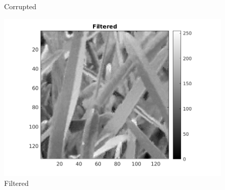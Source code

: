 \documentclass[12pt, a4paper]{article}
\begin{document}
\begin{figure}[h]
\begin{minipage}[c][1\width]{0.3\textwidth}
    	\caption{Corrupted}
	    \label{fig:3.3(b)}
    \end{minipage}
    \renewcommand{\thefigure}{3.3(c)}
    \begin{minipage}[c][1\width]{0.3\textwidth}
    	\includegraphics[width=1.5\textwidth]{grass_filtered.png}
    	\caption{Filtered}
	    \label{fig:3.3(c)}
    \end{minipage}
\end{figure}
\end{document}
